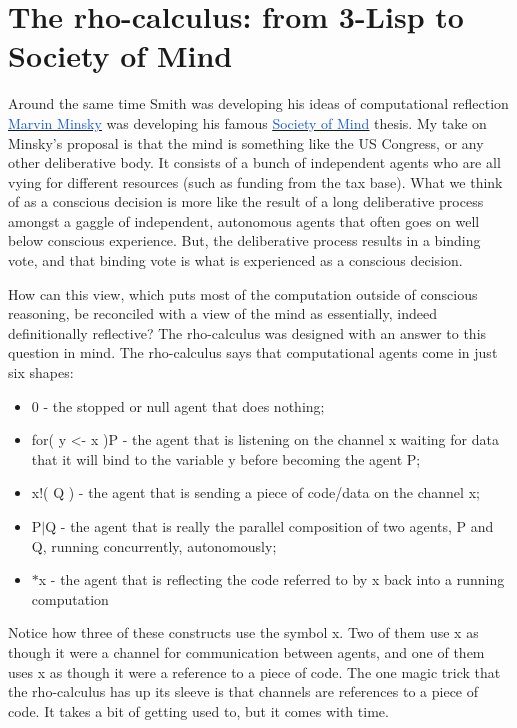 \documentclass[runningheads]{llncs}
\begin{document}
\vspace{1\baselineskip}
\section{The rho-calculus: from 3-Lisp to Society of Mind}

\vspace{1\baselineskip}
Around the same time Smith was developing his ideas of computational reflection \href{https://en.wikipedia.org/wiki/Marvin_Minsky}{\uline{\textcolor[HTML]{1155CC}{Marvin Minsky}}} was developing his famous \href{https://en.wikipedia.org/wiki/Society_of_Mind}{\uline{\textcolor[HTML]{1155CC}{Society of Mind}}} thesis. My take on Minsky’s proposal is that the mind is something like the US Congress, or any other deliberative body. It consists of a bunch of independent agents who are all vying for different resources (such as funding from the tax base). What we think of as a conscious decision is more like the result of a long deliberative process amongst a gaggle of independent, autonomous agents that often goes on well below conscious experience. But, the deliberative process results in a binding vote, and that binding vote is what is experienced as a conscious decision.



\vspace{1\baselineskip}
How can this view, which puts most of the computation outside of conscious reasoning, be reconciled with a view of the mind as essentially, indeed definitionally reflective? The rho-calculus was designed with an answer to this question in mind. The rho-calculus says that computational agents come in just six shapes:

\vspace{1\baselineskip}
\begin{itemize}
	\item 0 - the stopped or null agent that does nothing;

	\item for( y <- x )P - the agent that is listening on the channel x waiting for data that it will bind to the variable y before becoming the agent P;

	\item x!( Q ) - the agent that is sending a piece of code/data on the channel x;

	\item P$\vert$Q - the agent that is really the parallel composition of two agents, P and Q, running concurrently, autonomously;

	\item $\ast$x - the agent that is reflecting the code referred to by x back into a running computation

\end{itemize}
\vspace{1\baselineskip}
Notice how three of these constructs use the symbol x. Two of them use x as though it were a channel for communication between agents, and one of them uses x as though it were a reference to a piece of code. The one magic trick that the rho-calculus has up its sleeve is that channels are references to a piece of code. It takes a bit of getting used to, but it comes with time.
\end{document}
